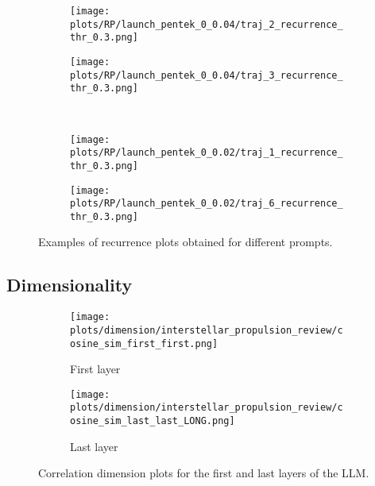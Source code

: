 \documentclass[a4paper,12pt]{article}
\begin{document}
\begin{figure}[H]
    \centering
    \begin{subfigure}[b]{0.48\textwidth}
        \centering
        \texttt{[image: plots/RP/launch\_pentek\_0\_0.04/traj\_2\_recurrence\_thr\_0.3.png]}
    \end{subfigure}\hfill
    \begin{subfigure}[b]{0.48\textwidth}
        \centering
        \texttt{[image: plots/RP/launch\_pentek\_0\_0.04/traj\_3\_recurrence\_thr\_0.3.png]}
    \end{subfigure}
    \\[0.5em]
    \begin{subfigure}[b]{0.48\textwidth}
        \centering
        \texttt{[image: plots/RP/launch\_pentek\_0\_0.02/traj\_1\_recurrence\_thr\_0.3.png]}
    \end{subfigure}\hfill
    \begin{subfigure}[b]{0.48\textwidth}
        \centering
        \texttt{[image: plots/RP/launch\_pentek\_0\_0.02/traj\_6\_recurrence\_thr\_0.3.png]}
    \end{subfigure}
    \caption{Examples of recurrence plots obtained for different prompts.}
    \label{fig:rp_interesting}
\end{figure}

\subsection{Dimensionality}

\begin{figure}[H]
    \centering
    \begin{subfigure}[b]{0.48\linewidth}
        \centering
        \texttt{[image: plots/dimension/interstellar\_propulsion\_review/cosine\_sim\_first\_first.png]}
        \caption{First layer}
    \end{subfigure}\hfill
    \begin{subfigure}[b]{0.48\linewidth}
        \centering
        \texttt{[image: plots/dimension/interstellar\_propulsion\_review/cosine\_sim\_last\_last\_LONG.png]}
        \caption{Last layer}
    \end{subfigure}
    \caption{Correlation dimension plots for the first and last layers of the LLM.}
    \label{fig:dim_first_last}
\end{figure}

\end{document}
